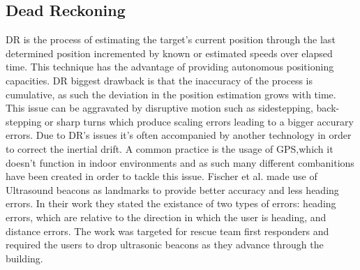 \subsection{Dead Reckoning}
\label{subsec:dr}

\ac{DR} is the process of estimating the target's current position through the last determined position incremented by known or estimated speeds over elapsed time. This technique has the advantage of providing autonomous positioning capacities. \ac{DR} biggest drawback is that the inaccuracy of the process is cumulative, as such the deviation in the position estimation grows with time. This issue can be aggravated by disruptive motion such as sidestepping, back-stepping or sharp turns which produce scaling errors leading to a bigger accurary errors. Due to \ac{DR}'s issues it's often accompanied by another technology in order to correct the inertial drift. A common practice is the usage of GPS,which it doesn't function in indoor environments and as such many different combanitions have been created in order to tackle this issue. Fischer et al. \cite{dr1} made use of Ultrasound beacons as landmarks to provide better accuracy and less heading errors. In their work they stated the existance of two types of errors: heading errors, which are relative to the direction in which the user is heading, and distance errors. The work was targeted for rescue team first responders and required the users to drop ultrasonic beacons as they advance through the building.
